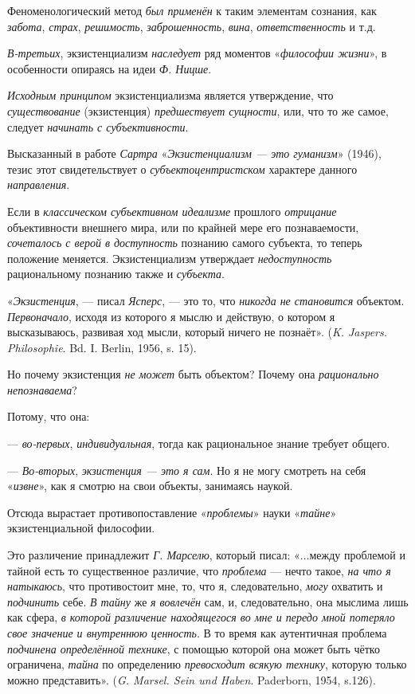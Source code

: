 \documentclass[a4paper,14pt,russian]{extreport}
\begin{document}
Феноменологический метод \emph{был применён} к таким элементам сознания, как \emph{забота}, \emph{страх}, \emph{решимость}, \emph{заброшенность}, \emph{вина}, \emph{ответственность} и т.д.

\emph{В-третьих}, экзистенциализм \emph{наследует} ряд моментов «\emph{философии жизни}», в особенности опираясь на идеи \emph{Ф. Ницше}.

\emph{Исходным принципом} экзистенциализма является утверждение, что \emph{существование} (экзистенция) \emph{предшествует сущности}, или, что то же самое, следует \emph{начинать с субъективности}.

Высказанный в работе \emph{Сартра} «\emph{Экзистенциализм --- это гуманизм}» (1946), тезис этот свидетельствует о \emph{субъектоцентристском} характере данного \emph{направления}.

Если в \emph{классическом субъективном идеализме} прошлого \emph{отрицание} объективности внешнего мира, или по крайней мере его познаваемости, \emph{сочеталось с верой в доступность} познанию самого субъекта, то теперь положение меняется. Экзистенциализм утверждает \emph{недоступность} рациональному познанию также и \emph{субъекта}.

«\emph{Экзистенция}, --- писал \emph{Ясперс}, --- это то, что \emph{никогда не становится} объектом. \emph{Первоначало}, исходя из которого я мыслю и действую, о котором я высказываюсь, развивая ход мысли, который ничего не познаёт». (\emph{K. Jaspers. Philosophie}. Bd. I. Berlin, 1956, s. 15).

Но почему экзистенция \emph{не может} быть объектом? Почему она \emph{рационально непознаваема}?

Потому, что она:

--- \emph{во-первых}, \emph{индивидуальная}, тогда как рациональное знание требует общего.

--- \emph{Во-вторых}, \emph{экзистенция --- это я сам}. Но я не могу смотреть на себя «\emph{извне}», как я смотрю на свои объекты, занимаясь наукой.

Отсюда вырастает противопоставление «\emph{проблемы}» науки «\emph{тайне}» экзистенциальной философии.

Это различение принадлежит \emph{Г. Марселю}, который писал: «...между проблемой и тайной есть то существенное различие, что \emph{проблема} --- нечто такое, \emph{на что я натыкаюсь}, что противостоит мне, то, что я, следовательно, \emph{могу} охватить и \emph{подчинить} себе. \emph{В тайну} же \emph{я вовлечён} сам, и, следовательно, она мыслима лишь как сфера, \emph{в которой различение находящегося во мне и передо мной потеряло свое значение и внутреннюю ценность}. В то время как аутентичная проблема \emph{подчинена определённой технике}, с помощью которой она может быть чётко ограничена, \emph{тайна} по определению \emph{превосходит всякую технику}, которую только можно представить». (\emph{G. Marsel. Sein und Haben}. Paderborn, 1954, s.126).
\end{document}
